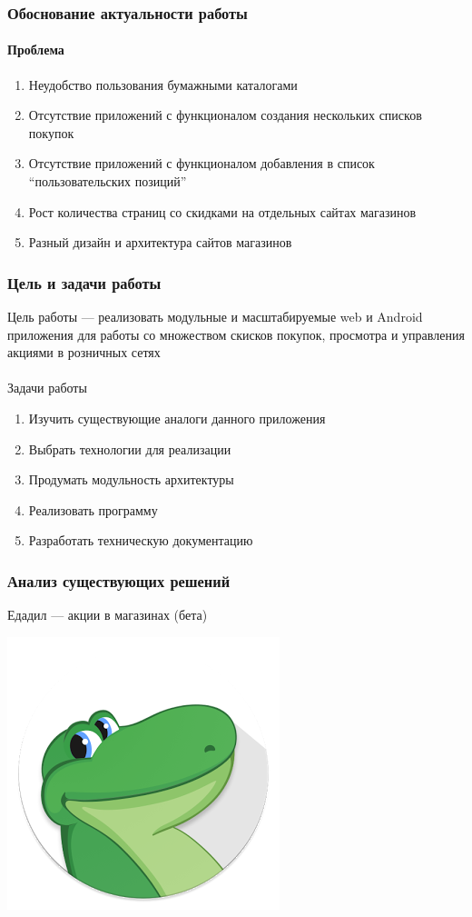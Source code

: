 \documentclass{beamer}
\begin{document}
\begin{frame}
    \frametitle{Обоснование актуальности работы}
    \framesubtitle{Проблема}
    \begin{enumerate}
        \item Неудобство пользования бумажными каталогами
        \item Отсутствие приложений с функционалом создания нескольких списков покупок
        \item Отсутствие приложений с функционалом добавления в список ``пользовательских позиций''
        \item Рост количества страниц со скидками на отдельных сайтах магазинов
        \item Разный дизайн и архитектура сайтов магазинов
    \end{enumerate}
\end{frame}

\begin{frame}
    \frametitle{Цель и задачи работы}
    Цель работы --- реализовать модульные и масштабируемые web и Android
    приложения для работы со множеством скисков покупок, просмотра и управления
    акциями в розничных сетях\\\\
    \bigskip
    Задачи работы
    \begin{enumerate}
        \item Изучить существующие аналоги данного приложения
        \item Выбрать технологии для реализации
        \item Продумать модульность архитектуры
        \item Реализовать программу
        \item Разработать техническую документацию
    \end{enumerate}
\end{frame}

\begin{frame}
\frametitle{Анализ существующих решений}
    Едадил — акции в магазинах (бета)
        \medskip
        \begin{center}
        \includegraphics[width=0.5\columnwidth]{edadeal.png}
        \end{center}
\end{frame}
\end{document}
